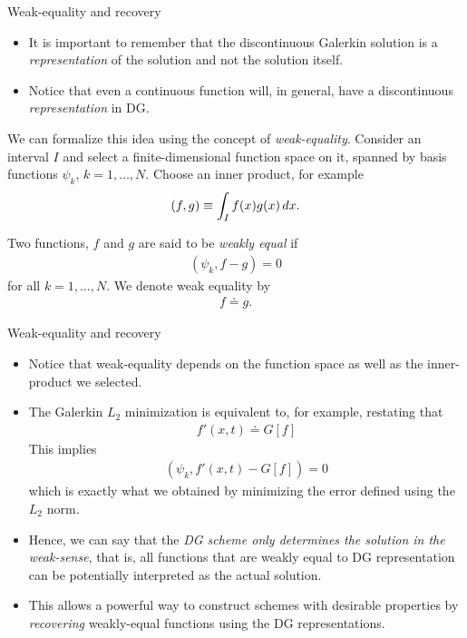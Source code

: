 \documentclass[pdf]{beamer}
\newcommand{\mypause}{}
\theoremstyle{definition}
\begin{document}
\begin{frame}{Weak-equality and recovery}
  \footnotesize
  \begin{itemize}
  \item It is important to remember that the discontinuous Galerkin
    solution is a \emph{representation} of the solution and not the
    solution itself.
  \item Notice that even a continuous function will, in general, have
    a discontinuous \emph{representation} in DG.
  \end{itemize}
  \mypause%
  We can formalize this idea using the concept of
  \emph{weak-equality}. Consider an interval $I$ and select a
  finite-dimensional function space on it, spanned by basis functions
  $\psi_k$, $k=1,\ldots,N$. Choose an inner product, for example
  \begin{align*}
    (f, g) \equiv \int_I f(x) g(x) \thinspace dx.
  \end{align*}

  \begin{definition}
    Two functions, $f$ and $g$ are said to be \emph{weakly equal} if
    \begin{align*}
      (\psi_k,f-g) = 0
    \end{align*}
    for all $k=1,\ldots,N$. We denote weak equality by
    \begin{align*}
      f \doteq g.
    \end{align*}
  \end{definition}  
  
\end{frame}


\begin{frame}{Weak-equality and recovery}
  \footnotesize
  \begin{itemize}
  \item Notice that weak-equality depends on the function space as
    well as the inner-product we selected.
  \item The Galerkin $L_2$ minimization is equivalent to, for example,
    restating that
    \begin{align*}
      f'(x,t) \doteq G[f]
    \end{align*}
    This implies
    \begin{align*}
      \left(\psi_k, f'(x,t)- G[f] \right) = 0
    \end{align*}
    which is exactly what we obtained by minimizing the error defined    
    using the  $L_2$ norm. \mypause
  \item Hence, we can say that the \emph{DG scheme only determines the
      solution in the weak-sense}, that is, all functions that are
    weakly equal to DG representation can be potentially interpreted
    as the actual solution.
  \item This allows a powerful way to construct schemes with desirable
    properties by \emph{recovering} weakly-equal functions using the
    DG representations.
  \end{itemize}

\end{frame}
\end{document}
